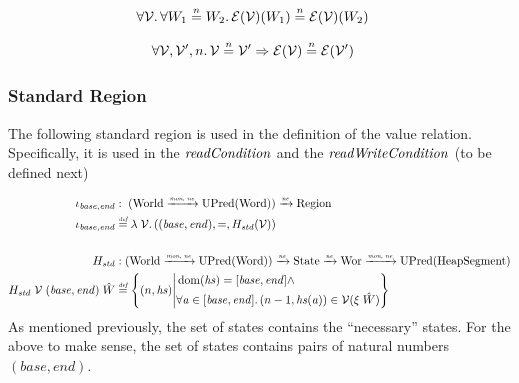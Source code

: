 \documentclass{article}
\newcommand{\monnefun}{\xrightarrow{\textit{\tiny{mon, ne}}}}
\newcommand{\nefun}{\xrightarrow{\textit{\tiny{ne}}}}
\newcommand{\defeq}{\stackrel{\textit{\tiny{def}}}{=}}
\newcommand{\nequal}[1][n]{\stackrel{\tiny{#1}}{=}}
\DeclareMathOperator{\dom}{dom}
\newcommand{\var}[1]{\mathit{#1}}
\newcommand{\hs}{\var{hs}}
\newcommand{\addr}{\var{a}}
\newcommand{\plainfun}[2]{
  \ifthenelse{\equal{#2}{}}
             {\mathit{#1}}
             {\mathit{#1}(#2)}
}
\newcommand{\readCond}[1]{\plainfun{readCondition}{#1}}
\newcommand{\writeCond}[1]{\plainfun{readWriteCondition}{#1}}
\newcommand{\asmType}{\plaindom{AsmType}}
\newcommand{\plaindom}[1]{\mathrm{#1}}
\newcommand{\Words}{\plaindom{Word}}
\newcommand{\HeapSegments}{\plaindom{HeapSegment}}
\newcommand{\States}{\plaindom{State}}
\newcommand{\Regions}{\plaindom{Region}}
\newcommand{\Worlds}{\plaindom{World}}
\newcommand{\Wor}{\plaindom{Wor}}
\newcommand{\UPred}[1]{\plaindom{UPred}(#1)}
\newcommand{\intr}[2]{\mathcal{#1}}
\newcommand{\valueintr}[1]{\intr{V}{#1}}
\newcommand{\exprintr}[1]{\intr{E}{#1}}
\newcommand{\stdvr}{\valueintr{\asmType}}
\newcommand{\stder}{\exprintr{\asmType}}
\newcommand{\npair}[2][n]{\left(#1,#2 \right)}
\begin{document}
\begin{lemma}
\label{lem:stder-ne-worlds}
\begin{align*}
  & \forall \stdvr \ldotp \forall W_1 \nequal W_2 \ldotp \stder(\stdvr)(W_1) \nequal \stder(\stdvr)(W_2)
\end{align*}
\end{lemma}

\begin{lemma}
\label{lem:stder-ne-vr}
\begin{align*}
  &\forall \stdvr, \stdvr', n \ldotp \stdvr \nequal \stdvr' \Rightarrow \stder(\stdvr) \nequal \stder(\stdvr')
\end{align*}
\end{lemma}


\subsubsection{Standard Region}
\label{subsubsec:standard-region}
The following standard region is used in the definition of the value relation. Specifically, it is used in the $\readCond{}$ and the $\writeCond{}$ (to be defined next)

\begin{align*}
  \iota_{\var{base},\var{end}} & : \; (\Worlds \monnefun \UPred{\Words}) \nefun \Regions\\
  \iota_{\var{base},\var{end}} & \defeq \lambda \; \stdvr \ldotp ((\var{base},\var{end}),=,H_{\var{std}} (\stdvr)) \\ & \\
  H_{\var{std}} & : (\Worlds \monnefun \UPred{\Words}) \nefun \States \nefun \Wor \monnefun \UPred{\HeapSegments} \\
  H_{\var{std}} \; \stdvr \; (\var{base},\var{end})\; \hat{W} &  \defeq \left\{ \npair{\hs} \middle|
                                               \begin{aligned}
                                                 & \dom(\hs) = [\var{base},\var{end}] \land \\
                                                 & \forall \addr \in [\var{base},\var{end}] \ldotp \npair[n-1]{\hs(\addr)} \in \stdvr(\xi \; \hat{W})
                                               \end{aligned} \right\}
\end{align*}
As mentioned previously, the set of states contains the ``necessary'' states. For the above to make sense, the set of states contains pairs of natural numbers $(\var{base},\var{end})$.
\end{document}
